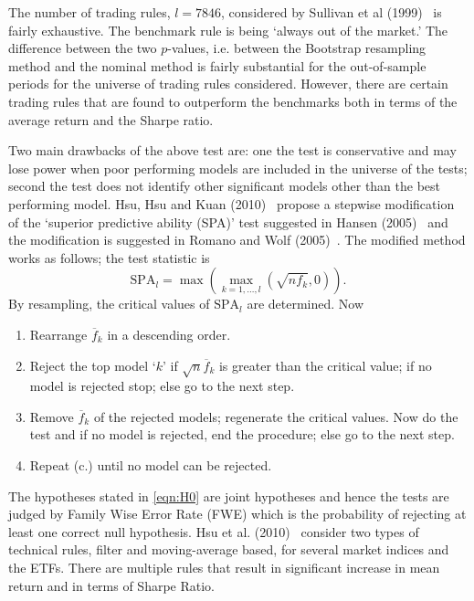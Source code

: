 The number of trading rules, $l=7846$, considered by Sullivan et al (1999)~\cite{sullivan1999data} is fairly exhaustive. The benchmark rule is being `always out of the market.' The difference between the two $p$-values, i.e. between the Bootstrap resampling method and the nominal method is fairly substantial for the out-of-sample periods for the universe of trading rules considered. However, there are certain trading rules that are found to outperform the benchmarks both in terms of the average return and the Sharpe ratio.


Two main drawbacks of the above test are: one the test is conservative and may lose power when poor performing models are included in the universe of the tests; second the test does not identify other significant models other than the best performing model. Hsu, Hsu and Kuan (2010)~\cite{hsukuan2010} propose a stepwise modification of the `superior predictive ability (SPA)' test suggested in Hansen (2005)~\cite{hansen2005} and the modification is suggested in Romano and Wolf (2005)~\cite{romano2005}. The modified method works as follows; the test statistic is
	\begin{equation} \label{eqn:SPA}
	\text{SPA}_l = \max\left(\max_{k=1,\ldots,l} \left( \sqrt{n f_k}, 0 \right) \right).
	\end{equation}
By resampling, the critical values of $\text{SPA}_l$ are determined. Now


\begin{enumerate}[(a.)]
\item Rearrange $\overline{f}_k$ in a descending order.
\item Reject the top model `$k$' if $\sqrt{n}\overline{f}_k$ is greater than the critical value; if no model is rejected stop; else go to the next step.
\item Remove $\overline{f}_k$ of the rejected models; regenerate the critical values. Now do the test and if no model is rejected, end the procedure; else go to the next step.
\item Repeat (c.) until no model can be rejected.
\end{enumerate}


The hypotheses stated in \eqref{eqn:H0} are joint hypotheses and hence the tests are judged by Family Wise Error Rate (FWE) which is the probability of rejecting at least one correct null hypothesis. Hsu et al. (2010)~\cite{hsukuan2010} consider two types of technical rules, filter and moving-average based, for several market indices and the ETFs. There are multiple rules that result in significant increase in mean return and in terms of Sharpe Ratio.


